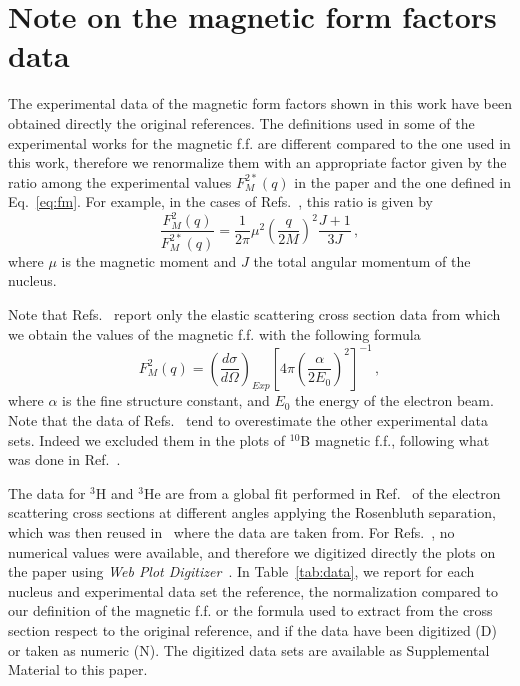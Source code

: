 \documentclass[aps,prc,floatfix,showpacs,twocolumn, preprintnumbers]{revtex4-2}
\newcommand{\beq}{\begin{equation}}
\newcommand{\eeq}{\end{equation}}
\def\beq{\begin{equation}}
\def\eeq{\end{equation}}
\begin{document}
\section{Note on the magnetic form factors data}
The experimental data of the magnetic form factors shown in this work have been obtained directly the original references.
The definitions used in some of the experimental works for the magnetic f.f. are different compared to the one used in this work, therefore we renormalize them with an appropriate factor given by the ratio among the experimental values $F^{2*}_M(q)$ in the paper and the one defined in Eq.~\eqref{eq:fm}. For example, in the cases of  Refs.~\cite{Vanpraet1965,Rand1966,Vanniftrik1971}, this ratio is given by
\beq\label{eq:ratio_ex}
\frac{F^2_M(q)}{F^{2*}_M(q)}=\frac{1}{2\pi}
   \mu^2\left(\frac{q}{2M}\right)^2\frac{J+1}{3J}\,,
   \eeq
   where $\mu$ is the magnetic moment and $J$ the total angular momentum of the nucleus.
   
Note that Refs.~\cite{Goldemberg1963, Peterson1962,Lapikas1975,Goldemberg1965} report only the elastic scattering cross section data from which we obtain the values of the magnetic f.f. with the following formula
\begin{equation}\label{eq:xsec-ff}
  F_M^{2}(q)=\left(\frac{d\sigma}{d\Omega}\right)_{Exp}
  \left[4\pi \left(\frac{\alpha}{2E_0}\right)^2
    \right]^{-1}\,,
\end{equation}
where $\alpha$ is the fine structure constant, and $E_0$ the energy of the electron beam.
Note that the data of Refs.~\cite{Goldemberg1963, Peterson1962,Goldemberg1965} tend to overestimate the other experimental data sets. Indeed we excluded them in the plots of ${}^{10}$B magnetic f.f., following what was done in Ref.~\cite{Donnelly1984}.

The data for ${}^3$H and ${}^3$He are from a global fit performed in Ref.~\cite{Amroun:1994qj} of the electron scattering cross sections at different angles applying the Rosenbluth separation, which was then reused in~\cite{Sick2001} where the data are taken from.
For Refs.~\cite{Vanniftrik1971,Lapikas1978}, no numerical values were available, and therefore we digitized directly the plots on the paper using {\it Web Plot Digitizer}~\cite{Rohatgi2022}.
In Table~\ref{tab:data}, we report for each nucleus and experimental data set the reference, the normalization compared to our definition of the magnetic f.f. or the formula used to extract from the cross section respect to the original reference, and if the data have been digitized (D) or taken as numeric (N). The digitized data sets are available as Supplemental Material to this paper.
\end{document}
